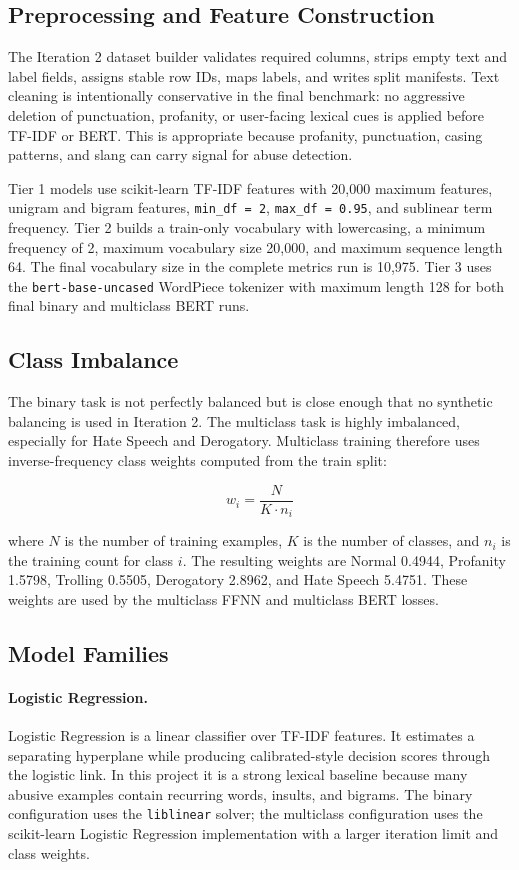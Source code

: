 \documentclass[11pt]{article}
\begin{document}
\subsection{Preprocessing and Feature Construction}

The Iteration 2 dataset builder validates required columns, strips empty text and label fields, assigns stable row IDs, maps labels, and writes split manifests. Text cleaning is intentionally conservative in the final benchmark: no aggressive deletion of punctuation, profanity, or user-facing lexical cues is applied before TF-IDF or BERT. This is appropriate because profanity, punctuation, casing patterns, and slang can carry signal for abuse detection.

Tier 1 models use scikit-learn TF-IDF features with 20,000 maximum features, unigram and bigram features, \texttt{min\_df = 2}, \texttt{max\_df = 0.95}, and sublinear term frequency. Tier 2 builds a train-only vocabulary with lowercasing, a minimum frequency of 2, maximum vocabulary size 20,000, and maximum sequence length 64. The final vocabulary size in the complete metrics run is 10,975. Tier 3 uses the \texttt{bert-base-uncased} WordPiece tokenizer with maximum length 128 for both final binary and multiclass BERT runs.

\subsection{Class Imbalance}

The binary task is not perfectly balanced but is close enough that no synthetic balancing is used in Iteration 2. The multiclass task is highly imbalanced, especially for Hate Speech and Derogatory. Multiclass training therefore uses inverse-frequency class weights computed from the train split:

\[
w_i = \frac{N}{K \cdot n_i}
\]

where \(N\) is the number of training examples, \(K\) is the number of classes, and \(n_i\) is the training count for class \(i\). The resulting weights are Normal 0.4944, Profanity 1.5798, Trolling 0.5505, Derogatory 2.8962, and Hate Speech 5.4751. These weights are used by the multiclass FFNN and multiclass BERT losses.

\subsection{Model Families}

\paragraph{Logistic Regression.}
Logistic Regression is a linear classifier over TF-IDF features. It estimates a separating hyperplane while producing calibrated-style decision scores through the logistic link. In this project it is a strong lexical baseline because many abusive examples contain recurring words, insults, and bigrams. The binary configuration uses the \texttt{liblinear} solver; the multiclass configuration uses the scikit-learn Logistic Regression implementation with a larger iteration limit and class weights.
\end{document}
